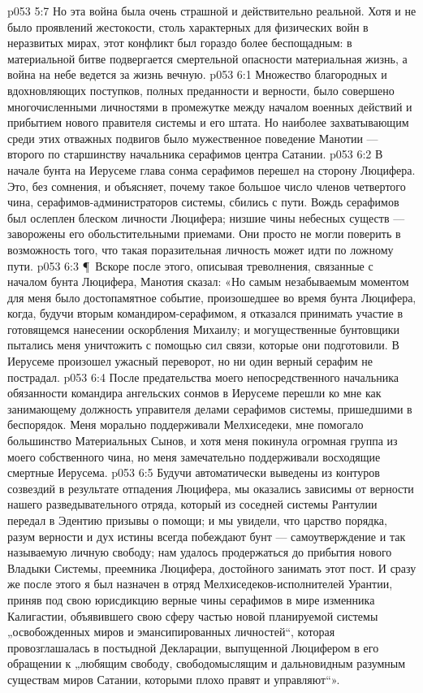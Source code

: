 \vs p053 5:7 Но эта война была очень страшной и действительно реальной. Хотя и не было проявлений жестокости, столь характерных для физических войн в неразвитых мирах, этот конфликт был гораздо более беспощадным: в материальной битве подвергается смертельной опасности материальная жизнь, а война на небе ведется за жизнь вечную.
\vs p053 6:1 Множество благородных и вдохновляющих поступков, полных преданности и верности, было совершено многочисленными личностями в промежутке между началом военных действий и прибытием нового правителя системы и его штата. Но наиболее захватывающим среди этих отважных подвигов было мужественное поведение Манотии --- второго по старшинству начальника серафимов центра Сатании.
\vs p053 6:2 В начале бунта на Иерусеме глава сонма серафимов перешел на сторону Люцифера. Это, без сомнения, и объясняет, почему такое большое число членов четвертого чина, серафимов\hyp{}администраторов системы, сбились с пути. Вождь серафимов был ослеплен блеском личности Люцифера; низшие чины небесных существ --- заворожены его обольстительными приемами. Они просто не могли поверить в возможность того, что такая поразительная личность может идти по ложному пути.
\vs p053 6:3 \P\ Вскоре после этого, описывая треволнения, связанные с началом бунта Люцифера, Манотия сказал: «Но самым незабываемым моментом для меня было достопамятное событие, произошедшее во время бунта Люцифера, когда, будучи вторым командиром\hyp{}серафимом, я отказался принимать участие в готовящемся нанесении оскорбления Михаилу; и могущественные бунтовщики пытались меня уничтожить с помощью сил связи, которые они подготовили. В Иерусеме произошел ужасный переворот, но ни один верный серафим не пострадал.
\vs p053 6:4 После предательства моего непосредственного начальника обязанности командира ангельских сонмов в Иерусеме перешли ко мне как занимающему должность управителя делами серафимов системы, пришедшими в беспорядок. Меня морально поддерживали Мелхиседеки, мне помогало большинство Материальных Сынов, и хотя меня покинула огромная группа из моего собственного чина, но меня замечательно поддерживали восходящие смертные Иерусема.
\vs p053 6:5 Будучи автоматически выведены из контуров созвездий в результате отпадения Люцифера, мы оказались зависимы от верности нашего разведывательного отряда, который из соседней системы Рантулии передал в Эдентию призывы о помощи; и мы увидели, что царство порядка, разум верности и дух истины всегда побеждают бунт --- самоутверждение и так называемую личную свободу; нам удалось продержаться до прибытия нового Владыки Системы, преемника Люцифера, достойного занимать этот пост. И сразу же после этого я был назначен в отряд Мелхиседеков\hyp{}исполнителей Урантии, приняв под свою юрисдикцию верные чины серафимов в мире изменника Калигастии, объявившего свою сферу частью новой планируемой системы „освобожденных миров и эмансипированных личностей“, которая провозглашалась в постыдной Декларации, выпущенной Люцифером в его обращении к „любящим свободу, свободомыслящим и дальновидным разумным существам миров Сатании, которыми плохо правят и управляют“».
